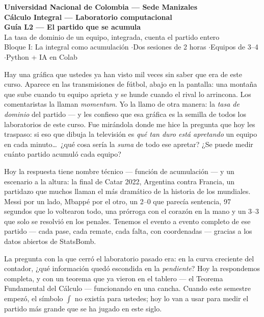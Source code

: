 \documentclass[12pt,letterpaper]{article}
\begin{document}
\begin{center}
    {\Large \textbf{Universidad Nacional de Colombia --- Sede Manizales}}\\
    {\large \textbf{Cálculo Integral --- Laboratorio computacional}}\\[0.8em]
    {\LARGE \textbf{Guía L2 --- El partido que se acumula}}\\[0.4em]
    {\large La tasa de dominio de un equipo, integrada, cuenta el partido entero}\\[0.5em]
    {\normalsize Bloque I: La integral como acumulación \quad$\cdot$\quad Dos sesiones de 2 horas \quad$\cdot$\quad Equipos de 3--4 \quad$\cdot$\quad Python + IA en Colab}
\end{center}

\begin{cajabitacora}
Hay una gráfica que ustedes ya han visto mil veces sin saber que era de este curso. Aparece en las transmisiones de fútbol, abajo en la pantalla: una montaña que sube cuando tu equipo aprieta y se hunde cuando el rival lo arrincona. Los comentaristas la llaman \emph{momentum}. Yo la llamo de otra manera: la \emph{tasa de dominio} del partido --- y les confieso que esa gráfica es la semilla de todos los laboratorios de este curso. Fue mirándola donde me hice la pregunta que hoy les traspaso: si eso que dibuja la televisión es \emph{qué tan duro está apretando} un equipo en cada minuto\ldots\ ¿qué cosa sería la \emph{suma} de todo ese apretar? ¿Se puede medir cuánto partido acumuló cada equipo?

Hoy la respuesta tiene nombre técnico --- función de acumulación --- y un escenario a la altura: la final de Catar 2022, Argentina contra Francia, un partidazo que muchos llaman el más dramático de la historia de los mundiales. Messi por un lado, Mbappé por el otro, un 2--0 que parecía sentencia, 97 segundos que lo voltearon todo, una prórroga con el corazón en la mano y un 3--3 que solo se resolvió en los penales. Tenemos el evento a evento completo de ese partido --- cada pase, cada remate, cada falta, con coordenadas --- gracias a los datos abiertos de StatsBomb.

La pregunta con la que cerró el laboratorio pasado era: en la curva creciente del contador, ¿qué información quedó escondida en la \emph{pendiente}? Hoy la respondemos completa, y con un teorema que ya vieron en el tablero --- el Teorema Fundamental del Cálculo --- funcionando en una cancha. Cuando este semestre empezó, el símbolo $\int$ no existía para ustedes; hoy lo van a usar para medir el partido más grande que se ha jugado en este siglo.
\end{cajabitacora}
\end{document}
